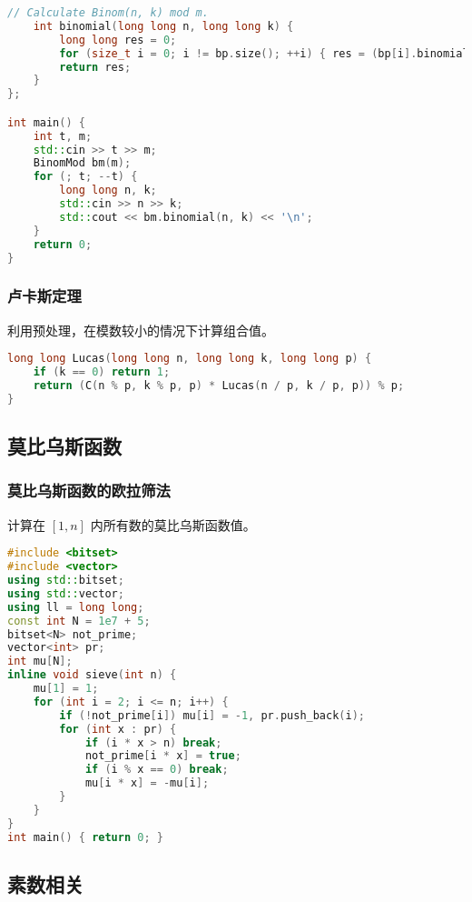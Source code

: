 \documentclass[9pt, a4paper, oneside]{book}
\begin{document}
\begin{lstlisting}[language={C++}]
    // Calculate Binom(n, k) mod m.
    int binomial(long long n, long long k) {
        long long res = 0;
        for (size_t i = 0; i != bp.size(); ++i) { res = (bp[i].binomial(n, k) * crt_m[i] + res) % m; }
        return res;
    }
};

int main() {
    int t, m;
    std::cin >> t >> m;
    BinomMod bm(m);
    for (; t; --t) {
        long long n, k;
        std::cin >> n >> k;
        std::cout << bm.binomial(n, k) << '\n';
    }
    return 0;
}\end{lstlisting}
\subsubsection{卢卡斯定理}
利用预处理，在模数较小的情况下计算组合值。
\begin{lstlisting}[language={C++}]
long long Lucas(long long n, long long k, long long p) {
    if (k == 0) return 1;
    return (C(n % p, k % p, p) * Lucas(n / p, k / p, p)) % p;
}\end{lstlisting}
\subsection{莫比乌斯函数}
\subsubsection{莫比乌斯函数的欧拉筛法}
计算在 $[1, n]$ 内所有数的莫比乌斯函数值。
\begin{lstlisting}[language={C++}]
#include <bitset>
#include <vector>
using std::bitset;
using std::vector;
using ll = long long;
const int N = 1e7 + 5;
bitset<N> not_prime;
vector<int> pr;
int mu[N];
inline void sieve(int n) {
    mu[1] = 1;
    for (int i = 2; i <= n; i++) {
        if (!not_prime[i]) mu[i] = -1, pr.push_back(i);
        for (int x : pr) {
            if (i * x > n) break;
            not_prime[i * x] = true;
            if (i % x == 0) break;
            mu[i * x] = -mu[i];
        }
    }
}
int main() { return 0; }\end{lstlisting}
\subsection{素数相关}
\end{document}
